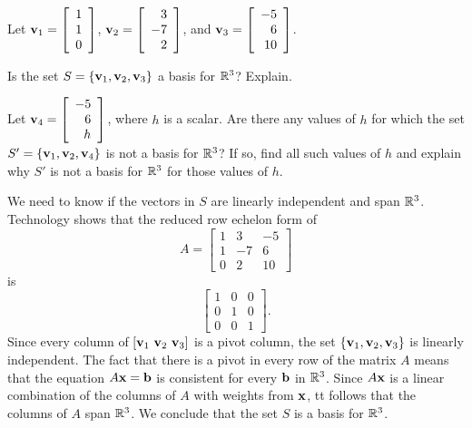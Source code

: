 \begin{example} Let $\mathbf{v}_1 = \left[ \begin{array}{c} 1 \\ 1 \\ 0 \end{array} \right]$, $\mathbf{v}_2 = \left[ \begin{array}{r} 3 \\ -7 \\ 2 \end{array} \right]$, and $\mathbf{v}_3 = \left[ \begin{array}{r} -5 \\ 6 \\ 10 \end{array} \right]$. 
	\ba
	\item Is the set $S = \left\{\mathbf{v}_1, \mathbf{v}_2, \mathbf{v}_3\right\}$ a basis for $\mathbb{R}^3$? Explain. 
	
	\item Let $\mathbf{v}_4 =  \left[ \begin{array}{r} -5 \\ 6 \\ h \end{array} \right]$, where $h$ is a scalar. Are there any values of $h$ for which the set $S' = \{\mathbf{v}_1, \mathbf{v}_2, \mathbf{v}_4\}$ is not a basis for $\mathbb{R}^3$? If so, find all such values of $h$ and explain why $S'$ is not a basis for $\mathbb{R}^3$ for those values of $h$. 
	
	\ea

\ExampleSolution
\ba
\item We need to know if the vectors in $S$ are linearly independent and span $\mathbb{R}^3$. Technology shows that the reduced row echelon form of 
\[A=\left[ \begin{array}{crr} 1&3&-5 \\ 1&-7&6 \\ 0&2&10 \end{array} \right]\]
is
\[\left[ \begin{array}{ccc} 1&0&0 \\ 0&1&0 \\ 0&0&1 \end{array} \right].\]
Since every column of $[\vv_1 \ \vv_2 \ \vv_3]$ is a pivot column, the set $\{\mathbf{v}_1, \mathbf{v}_2, \mathbf{v}_3\}$ is linearly independent. The fact that there is a pivot in every row of the matrix $A$ means that the equation $A \mathbf{x} = \mathbf{b}$ is consistent for every $\mathbf{b}$ in $\mathbb{R}^3$. Since $A \mathbf{x}$ is a linear combination of the columns of $A$ with weights from $\mathbf{x}$, tt follows that the columns of $A$ span $\mathbb{R}^3$. We conclude that the set $S$ is a basis for $\mathbb{R}^3$. 



\end{example}
